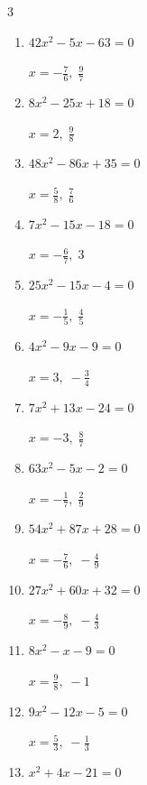 \begin{multicols}{3}
\begin{enumerate}
        $\displaystyle x=\frac{1}{2},\; \frac{9}{4}$

  \item $42x^{2}-5x-63=0$

        $\displaystyle x=-\frac{7}{6},\; \frac{9}{7}$

\columnbreak %

  \item $8x^{2}-25x+18=0$

        $\displaystyle x=2,\; \frac{9}{8}$

  \item $48x^{2}-86x+35=0$

        $\displaystyle x=\frac{5}{8},\; \frac{7}{6}$

  \item $7x^{2}-15x-18=0$

        $\displaystyle x=-\frac{6}{7},\; 3$

  \item $25x^{2}-15x-4=0$

        $\displaystyle x=-\frac{1}{5},\; \frac{4}{5}$

  \item $4x^{2}-9x-9=0$

        $\displaystyle x=3,\; -\frac{3}{4}$

  \item $7x^{2}+13x-24=0$

        $\displaystyle x=-3,\; \frac{8}{7}$

  \item $63x^{2}-5x-2=0$

        $\displaystyle x=-\frac{1}{7},\; \frac{2}{9}$

  \item $54x^{2}+87x+28=0$

        $\displaystyle x=-\frac{7}{6},\; -\frac{4}{9}$

  \item $27x^{2}+60x+32=0$

        $\displaystyle x=-\frac{8}{9},\; -\frac{4}{3}$

  \item $8x^{2}-x-9=0$

        $\displaystyle x=\frac{9}{8},\; -1$

\columnbreak %

  \item $9x^{2}-12x-5=0$

        $\displaystyle x=\frac{5}{3},\; -\frac{1}{3}$

  \item $x^{2}+4x-21=0$


\end{enumerate}
\end{multicols}
